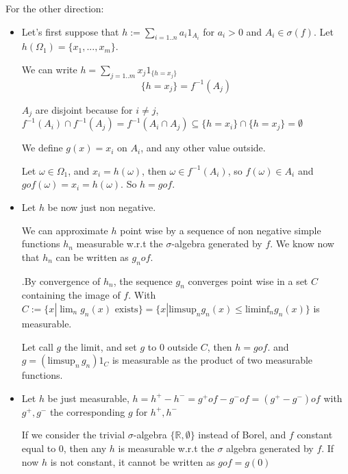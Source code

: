 \documentclass[12pt]{article}
\newcommand{\inter}[1]{\underset{#1}{\cap} }
\begin{document}
For the other direction:
\begin{itemize}

\item
Let's first suppose that $h := \sum_{i=1..n} a_i 1_{A_i}$ for $a_i > 0$ and $A_i \in \sigma(f)$. Let $h(\Omega_1) = \{x_1, ..., x_m\}$.


We can write $h = \sum_{j=1..m} x_j 1_{\{h=x_j\}}$
$$\{ h = x_j \} = f^{-1}(A_j)$$

$A_j$ are disjoint because for $i \neq j$, $f^{-1}(A_i) \inter{} f^{-1}(A_j) = f^{-1}(A_i \inter{} A_j) \subseteq \{h = x_i\} \inter{} \{h = x_j\} = \emptyset$


We define $g(x) = x_i$ on $A_i$, and any other value outside. 

Let $\omega \in \Omega_1$, and $x_i = h(\omega)$, then $\omega \in f^{-1}(A_i)$, so $f(\omega) \in A_i$ and $gof(\omega) = x_i = h(\omega)$. So $h = gof$.

\item
Let $h$ be now just non negative.


We can approximate $h$ point wise by a sequence of non negative simple functions $h_n$ measurable w.r.t the $\sigma$-algebra generated by $f$. We know now that $h_n$ can be written as $g_n o f$.

.By convergence of $h_n$, the sequence $g_n$ converges point wise in a set $C$ containing the image of $f$. With $C := \{ x | \lim_n g_n(x) \text{ exists} \} = \{x | \text{limsup}_n g_n(x) \leq \text{liminf}_n g_n(x) \}$ is measurable.

Let call $g$ the limit, and set $g$ to 0 outside $C$, then $h = gof$. and $g = (\text{limsup}_n \, g_n) 1_C$ is measurable as the product of two measurable functions.

\item
Let $h$ be just measurable, $h = h^+ - h^- = g^+of - g^-of = (g^+ - g^-) o f$ with $g^+, g^-$ the corresponding $g$ for $h^+, h^-$

If we consider the trivial $\sigma$-algebra $\{\mathbb{R}, \emptyset \}$ instead of Borel, and $f$ constant equal to $0$, then any $h$ is measurable w.r.t the $\sigma$ algebra generated by $f$. If now $h$ is not constant, it cannot be written as $gof = g(0)$
\end{itemize}
\end{document}
